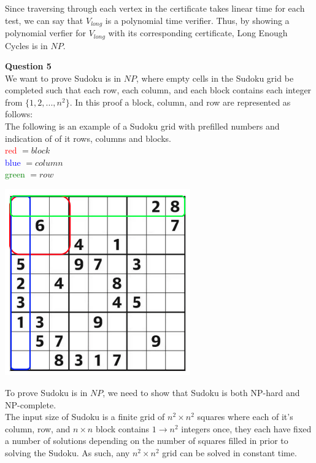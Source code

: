 \documentclass{article}
\begin{document}
Since traversing through each vertex in the certificate takes linear time for each test, we can say that $V_{long}$ is a polynomial time verifier. Thus, by showing a polynomial verfier for $V_{long}$ with its corresponding certificate, Long Enough Cycles is in $NP$.

\break
{\bf Question 5}\\
We want to prove Sudoku is in $NP$, where empty cells in the Sudoku grid be completed such that each row, each column, and each block contains each integer from $\{ 1, 2, ..., n^2 \}$. In this proof a block, column, and row are represented as follows: \\

The following is an example of a Sudoku grid with prefilled numbers and indication of of it rows, columns and blocks.\\

\textcolor{red}{red }$=block$\\
\textcolor{blue}{blue }$=column$\\
\textcolor{green}{green }$=row$\\

\begin{center}
    \includegraphics[width=0.6\textwidth]{5.png}
\end{center}

To prove Sudoku is in $NP$, we need to show that Sudoku is both NP-hard and NP-complete.\\

The input size of Sudoku is a finite grid of $n^2 \times n^2$ squares where each of it's column, row, and $n \times n$ block contains $1 \rightarrow n^2$ integers once, they each have fixed a number of solutions depending on the number of squares filled in prior to solving the Sudoku. As such, any $n^2 \times n^2$ grid can be solved in constant time.\\
\end{document}
